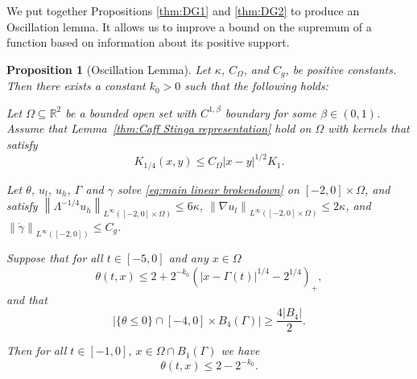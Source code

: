 \documentclass[11pt]{amsart}
\newtheorem{proposition}[theorem]{Proposition}
\theoremstyle{remark}
\theoremstyle{definition}
\newcommand{\R}{\mathbb{R}}
\newcommand{\norm}[1]{\left\lVert#1\right\rVert}
\newcommand{\paren}[1]{\left( #1 \right)}
\newcommand{\abs}[1]{\left\lvert #1 \right\rvert}
\newcommand{\grad}{\nabla}
\newcommand{\ulow}{u_l}
\newcommand{\uhigh}{u_h}
\newcommand{\Cgamma}{C_g}
\newcommand{\Comega}{C_\Omega}
\begin{document}
We put together Propositions \ref{thm:DG1} and \ref{thm:DG2} to produce an Oscillation lemma.  It allows us to improve a bound on the supremum of a function based on information about its positive support.  

\begin{proposition}[Oscillation Lemma] \label{thm:oscillation general}
Let $\kappa$, $\Comega$, and $\Cgamma$, be positive constants. Then there exists a constant $k_0>0$ such that the following holds:

Let $\Omega \subseteq \R^2$ be a bounded open set with $C^{1,\beta}$ boundary for some $\beta \in (0,1)$.  Assume that Lemma~\ref{thm:Caff Stinga representation} hold on $\Omega$ with kernels that satisfy
\[ K_{1/4}(x,y) \leq \Comega |x-y|^{1/2} K_{1}. \]

Let $\theta$, $\ulow$, $\uhigh$, $\Gamma$ and $\gamma$ solve \eqref{eq:main linear brokendown} on $[-2,0]\times\Omega$, and satisfy $\norm{\Lambda^{-1/4} \uhigh}_{L^\infty([-2,0]\times\Omega)} \leq 6 \kappa$, $\norm{\grad \ulow}_{L^\infty([-2,0]\times\Omega)} \leq 2\kappa$, and $\norm{\dot{\gamma}}_{L^\infty([-2,0])} \leq \Cgamma$.  


Suppose that for all $t \in [-5,0]$ and any $x \in \Omega$
\[ \theta(t,x) \leq 2 + 2^{-k_0} \paren{|x-\Gamma(t)|^{1/4}-2^{1/4}}_+, \]
and that
\[ \abs{\{\theta \leq 0\} \cap [-4,0]\times B_4(\Gamma)} \geq \frac{4|B_4|}{2}. \]

Then for all $t \in [-1,0]$, $x \in \Omega \cap B_1(\Gamma)$ we have
\[ \theta(t,x) \leq 2 - 2^{-k_0}. \]
\end{proposition}
\end{document}
